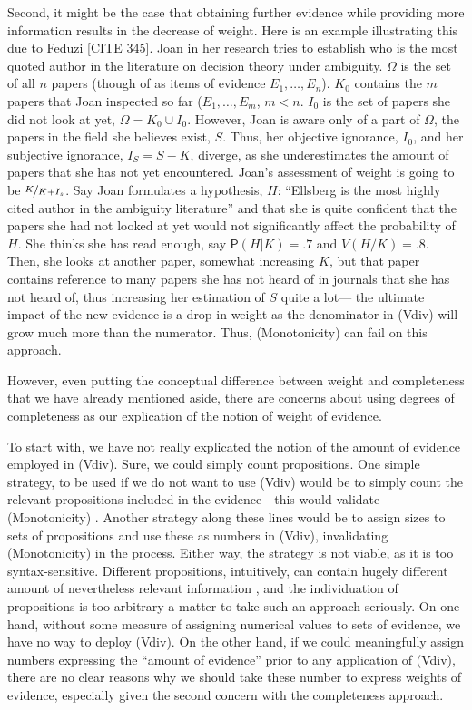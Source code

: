 \documentclass[
  10pt,
  dvipsnames,enabledeprecatedfontcommands]{scrartcl}
\newcommand{\pr}[1]{\mathsf{P}(#1)}
\begin{document}
Second, it might be the case that obtaining further evidence while
providing more information results in the decrease of weight. Here is an
example illustrating this due to Feduzi {[}CITE 345{]}. Joan in her
research tries to establish who is the most quoted author in the
literature on decision theory under ambiguity. \(\Omega\) is the set of
all \(n\) papers (though of as items of evidence \(E_1, \dots, E_n\)).
\(K_0\) contains the \(m\) papers that Joan inspected so far
(\(E_1, \dots, E_m\), \(m<n\). \(I_0\) is the set of papers she did not
look at yet, \(\Omega = K_0 \cup I_0\). However, Joan is aware only of a
part of \(\Omega\), the papers in the field she believes exist, \(S\).
Thus, her objective ignorance, \(I_0\), and her subjective ignorance,
\(I_S = S- K\), diverge, as she underestimates the amount of papers that
she has not yet encountered. Joan's assessment of weight is going to be
\(\nicefrac{K}{K+I_s}\). Say Joan formulates a hypothesis, \(H\):
``Ellsberg is the most highly cited author in the ambiguity literature''
and that she is quite confident that the papers she had not looked at
yet would not significantly affect the probability of \(H\). She thinks
she has read enough, say \(\pr{H \vert K} = .7\) and \(V(H/K) = .8\).
Then, she looks at another paper, somewhat increasing \(K\), but that
paper contains reference to many papers she has not heard of in journals
that she has not heard of, thus increasing her estimation of \(S\) quite
a lot--- the ultimate impact of the new evidence is a drop in weight as
the denominator in (Vdiv) will grow much more than the numerator. Thus,
(Monotonicity)  can fail on this approach.

However, even putting the conceptual difference between weight and
completeness that we have already mentioned aside, there are concerns
about using degrees of completeness as our explication of the notion of
weight of evidence.

To start with, we have not really explicated the notion of the amount of
evidence employed in (Vdiv). Sure, we could simply count propositions.
One simple strategy, to be used if we do not want to use (Vdiv) would be
to simply count the relevant propositions included in the
evidence---this would validate (Monotonicity) .
Another strategy along these lines would be to assign sizes to sets of
propositions and use these as numbers in (Vdiv), invalidating
(Monotonicity) in the process. Either way, the strategy is not viable,
as it is too syntax-sensitive. Different propositions, intuitively, can
contain hugely different amount of nevertheless relevant information
, and the individuation
of propositions is too arbitrary a matter to take such an approach
seriously. On one hand, without some measure of assigning numerical
values to sets of evidence, we have no way to deploy (Vdiv). On the
other hand, if we could meaningfully assign numbers expressing the
``amount of evidence'' prior to any application of (Vdiv), there are no
clear reasons why we should take these number to express weights of
evidence, especially given the second concern with the completeness
approach.
\end{document}

